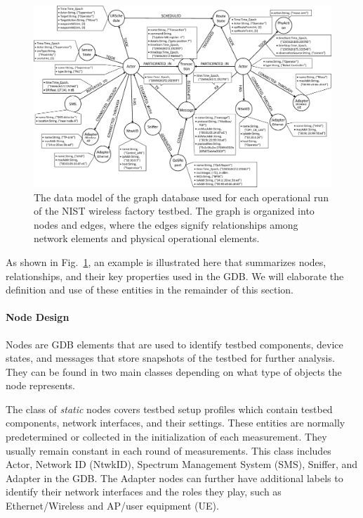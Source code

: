 \begin{figure}
	\centering
	\includegraphics[width=\textwidth]{chapter-gdb-appl/figures/graph_schema_1209.eps}
	\caption{The data model of the graph database used for each operational run of the NIST wireless factory testbed.  The graph is organized into nodes and edges, where the edges signify relationships among network elements and physical operational elements.}
	\label{gdbappl:fig:database:schema}
\end{figure}

As shown in Fig.~\ref{gdbappl:fig:database:schema}, an example is illustrated here that summarizes nodes, relationships, and their key properties used in the GDB. We will elaborate the definition and use of these entities in the remainder of this section.			


\paragraph{Node Design}

Nodes are GDB elements that are used to identify testbed components, device states, and messages that store snapshots of the testbed for further analysis. They can be found in two main classes depending on what type of objects the node represents.

The class of \textit{static} nodes covers testbed setup profiles which contain testbed components, network interfaces, and their settings. These entities are normally predetermined or collected in the initialization of each measurement. They usually remain constant in each round of measurements. This class includes Actor, Network ID (NtwkID), Spectrum Management System (SMS), Sniffer, and Adapter in the GDB. The Adapter nodes can further have additional labels to identify their network interfaces and the roles they play, such as Ethernet/Wireless and AP/user equipment (UE).

